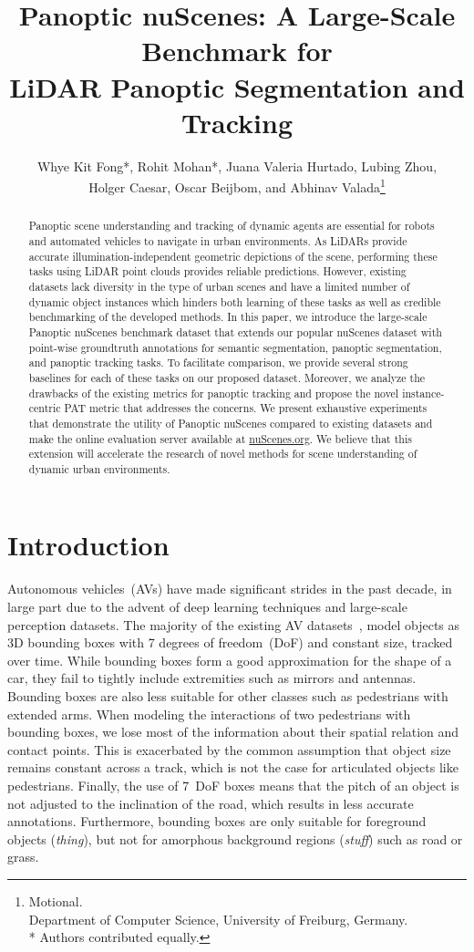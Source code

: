 \documentclass[letterpaper, 10 pt, journal, twoside]{IEEEtran}
\title{\LARGE \bf
Panoptic nuScenes: A Large-Scale Benchmark for\\LiDAR Panoptic Segmentation and Tracking
}
\author{Whye Kit Fong*, Rohit Mohan*, Juana Valeria Hurtado, Lubing Zhou,\\ Holger Caesar, Oscar Beijbom, and Abhinav Valada\thanks{ Motional.\\
 Department of Computer Science, University of Freiburg, Germany.\\
* Authors contributed equally.}}
\begin{document}
\maketitle
\thispagestyle{empty}
\pagestyle{empty}

\begin{abstract}
Panoptic scene understanding and tracking of dynamic agents are essential for robots and automated vehicles to navigate in urban environments. As LiDARs provide accurate illumination-independent geometric depictions of the scene, performing these tasks using LiDAR point clouds provides reliable predictions. However, existing datasets lack diversity in the type of urban scenes and have a limited number of dynamic object instances which hinders both learning of these tasks as well as credible benchmarking of the developed methods. In this paper, we introduce the large-scale Panoptic nuScenes benchmark dataset that extends our popular nuScenes dataset with point-wise groundtruth annotations for semantic segmentation, panoptic segmentation, and panoptic tracking tasks. To facilitate comparison, we provide several strong baselines for each of these tasks on our proposed dataset. Moreover, we analyze the drawbacks of the existing metrics for panoptic tracking and propose the novel instance-centric PAT metric that addresses the concerns. We present exhaustive experiments that demonstrate the utility of Panoptic nuScenes compared to existing datasets and make the online evaluation server available at \url{nuScenes.org}. We believe that this extension will accelerate the research of novel methods for scene understanding of dynamic urban environments.
\end{abstract}

\section{Introduction}

Autonomous vehicles~(AVs) have made significant strides in the past decade, in large part due to the advent of deep learning techniques and large-scale perception datasets.
The majority of the existing AV datasets~\cite{Geiger2013IJRR, caesar2020nuscenes, chang2019argoverse, houston2020one, sun2020scalability}, model objects as 3D bounding boxes with 7 degrees of freedom~(DoF) and constant size, tracked over time.
While bounding boxes form a good approximation for the shape of a car, they fail to tightly include extremities such as mirrors and antennas. Bounding boxes are also less suitable for other classes such as pedestrians with extended arms. When modeling the interactions of two pedestrians with bounding boxes, we lose most of the information about their spatial relation and contact points.
This is exacerbated by the common assumption that object size remains constant across a track, which is not the case for articulated objects like pedestrians.
Finally, the use of 7~DoF boxes means that the pitch of an object is not adjusted to the inclination of the road, which results in less accurate annotations.
Furthermore, bounding boxes are only suitable for foreground objects (\emph{thing}), but not for amorphous background regions (\emph{stuff}) such as road or grass.
\end{document}
